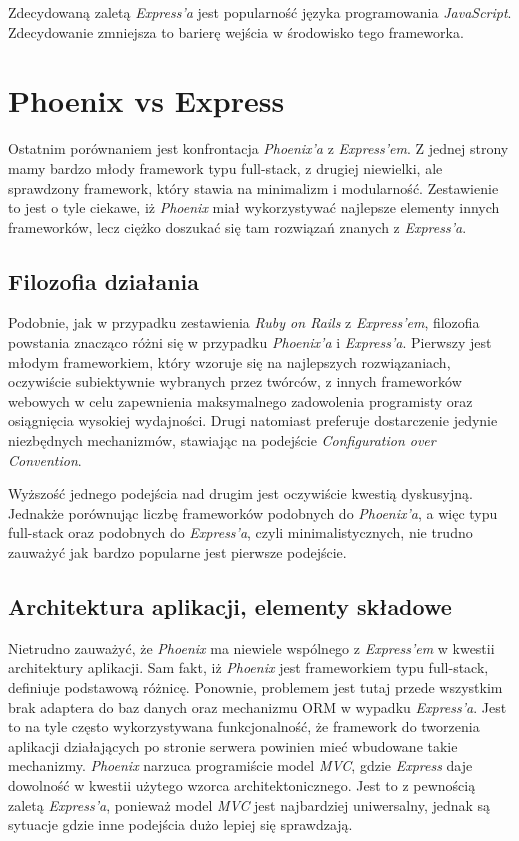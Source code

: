 \documentclass[mgr,oneside]{mgr}
\begin{document}
Zdecydowaną zaletą \textit{Express'a} jest popularność języka programowania \textit{JavaScript}. Zdecydowanie zmniejsza to barierę wejścia w środowisko tego frameworka.

\section{Phoenix vs Express}
Ostatnim porównaniem jest konfrontacja \textit{Phoenix'a} z \textit{Express'em}. Z jednej strony mamy bardzo młody framework typu full-stack, z drugiej niewielki, ale sprawdzony framework, który stawia na minimalizm i modularność. Zestawienie to jest o tyle ciekawe, iż \textit{Phoenix} miał wykorzystywać najlepsze elementy innych frameworków, lecz ciężko doszukać się tam rozwiązań znanych z \textit{Express'a}.

\subsection{Filozofia działania}
Podobnie, jak w przypadku zestawienia \textit{Ruby on Rails} z \textit{Express'em}, filozofia powstania znacząco różni się w przypadku \textit{Phoenix'a} i \textit{Express'a}. Pierwszy jest młodym frameworkiem, który wzoruje się na najlepszych rozwiązaniach, oczywiście subiektywnie wybranych przez twórców, z innych frameworków webowych w celu zapewnienia maksymalnego zadowolenia programisty oraz osiągnięcia wysokiej wydajności. Drugi natomiast preferuje dostarczenie jedynie niezbędnych mechanizmów, stawiając na podejście \emph{Configuration over Convention}.

Wyższość jednego podejścia nad drugim jest oczywiście kwestią dyskusyjną. Jednakże porównując liczbę frameworków podobnych do \emph{Phoenix'a}, a więc typu full-stack oraz podobnych do \emph{Express'a}, czyli minimalistycznych, nie trudno zauważyć jak bardzo popularne jest pierwsze podejście.

\subsection{Architektura aplikacji, elementy składowe}
Nietrudno zauważyć, że \emph{Phoenix} ma niewiele wspólnego z \emph{Express'em} w kwestii architektury aplikacji. Sam fakt, iż \emph{Phoenix} jest frameworkiem typu full-stack, definiuje podstawową różnicę. Ponownie, problemem jest tutaj przede wszystkim brak adaptera do baz danych oraz mechanizmu ORM w wypadku \emph{Express'a}. Jest to na tyle często wykorzystywana funkcjonalność, że framework do tworzenia aplikacji działających po stronie serwera powinien mieć wbudowane takie mechanizmy. \emph{Phoenix} narzuca programiście model \emph{MVC}, gdzie \emph{Express} daje dowolność w kwestii użytego wzorca architektonicznego. Jest to z pewnością zaletą \emph{Express'a}, ponieważ model \emph{MVC} jest najbardziej uniwersalny, jednak są sytuacje gdzie inne podejścia dużo lepiej się sprawdzają.
\end{document}
